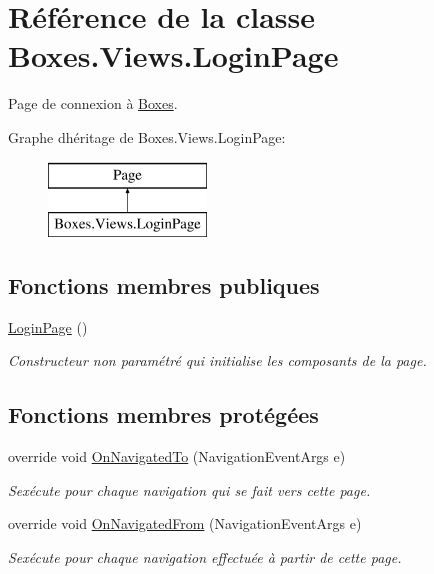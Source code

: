 \hypertarget{class_boxes_1_1_views_1_1_login_page}{}\section{Référence de la classe Boxes.\+Views.\+Login\+Page}
\label{class_boxes_1_1_views_1_1_login_page}


Page de connexion à \hyperlink{namespace_boxes}{Boxes}.  


Graphe d\textquotesingle{}héritage de Boxes.\+Views.\+Login\+Page\+:\begin{figure}[H]
\begin{center}
\leavevmode
\includegraphics[height=2.000000cm]{class_boxes_1_1_views_1_1_login_page}
\end{center}
\end{figure}
\subsection*{Fonctions membres publiques}
\begin{DoxyCompactItemize}
\item 
\hyperlink{class_boxes_1_1_views_1_1_login_page_ad63d5042555bd5b3b9090ab7d7d91800}{Login\+Page} ()
\begin{DoxyCompactList}\small\item\em Constructeur non paramétré qui initialise les composants de la page. \end{DoxyCompactList}\end{DoxyCompactItemize}
\subsection*{Fonctions membres protégées}
\begin{DoxyCompactItemize}
\item 
override void \hyperlink{class_boxes_1_1_views_1_1_login_page_aec548aa47d65810e64e73b3e5a4e2e24}{On\+Navigated\+To} (Navigation\+Event\+Args e)
\begin{DoxyCompactList}\small\item\em S\textquotesingle{}exécute pour chaque navigation qui se fait vers cette page. \end{DoxyCompactList}\item 
override void \hyperlink{class_boxes_1_1_views_1_1_login_page_abe31111ccf34025fe254d091d9461c21}{On\+Navigated\+From} (Navigation\+Event\+Args e)
\begin{DoxyCompactList}\small\item\em S\textquotesingle{}exécute pour chaque navigation effectuée à partir de cette page. \end{DoxyCompactList}\end{DoxyCompactItemize}
